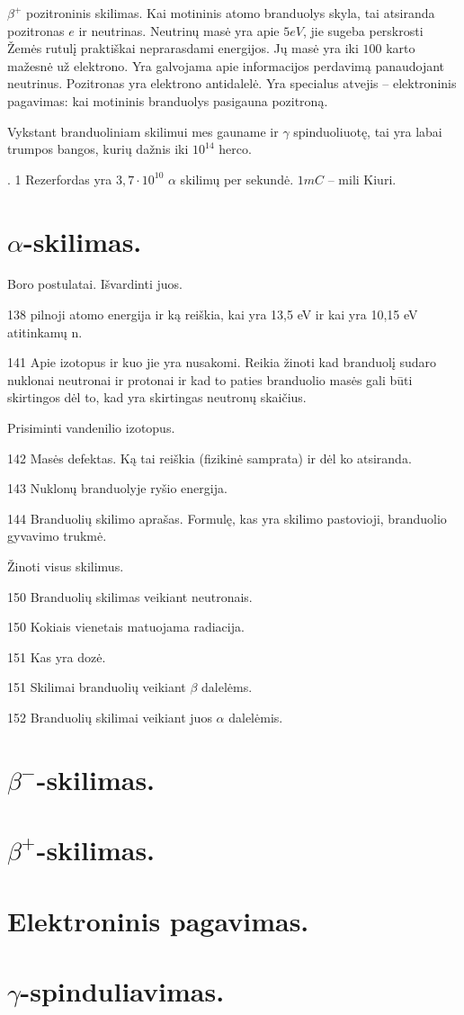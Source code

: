 $\beta^{+}$ pozitroninis skilimas. Kai motininis atomo branduolys
skyla, tai atsiranda pozitronas $e$ ir neutrinas. Neutrinų masė
yra apie $5 eV$, jie sugeba perskrosti Žemės rutulį praktiškai
neprarasdami energijos. Jų masė yra iki $100$ karto mažesnė už
elektrono. Yra galvojama apie informacijos perdavimą panaudojant
neutrinus. Pozitronas yra elektrono antidalelė.
Yra specialus atvejis – elektroninis pagavimas: kai motininis
branduolys pasigauna pozitroną.

Vykstant branduoliniam skilimui mes gauname ir $\gamma$ spinduoliuotę,
tai yra labai trumpos bangos, kurių dažnis iki $10^{14}$ herco.

. 1 Rezerfordas yra $3,7 \cdot 10^{10}$ $\alpha$ skilimų
per sekundė.
$1mC$ – mili Kiuri.


\section{$\alpha$-skilimas.}

\begin{remember}
  \item Boro postulatai. Išvardinti juos.
  \item 138 pilnoji atomo energija ir ką reiškia, kai yra 13,5 eV ir
    kai yra 10,15 eV atitinkamų n.
  \item 141 Apie izotopus ir kuo jie yra nusakomi. Reikia žinoti
    kad branduolį sudaro nuklonai neutronai ir protonai ir kad
    to paties branduolio masės gali būti skirtingos dėl to, kad
    yra skirtingas neutronų skaičius.
  \item Prisiminti vandenilio izotopus.
  \item 142 Masės defektas. Ką tai reiškia (fizikinė samprata) ir dėl
    ko atsiranda.
  \item 143 Nuklonų branduolyje ryšio energija.
  \item 144 Branduolių skilimo aprašas. Formulę, kas yra skilimo
    pastovioji, branduolio gyvavimo trukmė.
  \item Žinoti visus skilimus.
  \item 150 Branduolių skilimas veikiant neutronais.
  \item 150 Kokiais vienetais matuojama radiacija.
  \item 151 Kas yra dozė.
  \item 151 Skilimai branduolių veikiant $\beta$ dalelėms.
  \item 152 Branduolių skilimai veikiant juos $\alpha$ dalelėmis.
\end{remember}

\section{$\beta^{-}$-skilimas.}
\section{$\beta^{+}$-skilimas.}
\section{Elektroninis pagavimas.}
\section{$\gamma$-spinduliavimas.}
